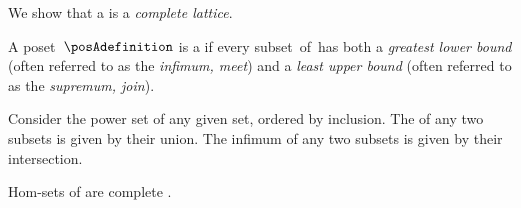 We show that a \DP {} is a \emph{complete lattice}.

\begin{definition}
    \label{def:complete-lattice}
    A poset~$\posAdefinition$ is a  if every subset~\subA of~\posAset has both a \emph{greatest lower bound} (often referred to as the \emph{infimum, meet}) and a \emph{least upper bound} (often referred to as the \emph{supremum, join}).
\end{definition}

\begin{example}
    Consider the power set of any given set, ordered by inclusion.
    The  of any two subsets is given by their union.
    The infimum of any two subsets is given by their intersection.
\end{example}

\begin{lemma}
    \label{lem:DP-homsets-complete-lattice}
    Hom-sets of \DP are complete .
\end{lemma}

